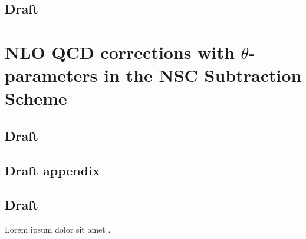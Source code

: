 \documentclass[a4paper, 12pt]{book}
\begin{document}
\section{Draft}

\clearpage

\chapter{NLO QCD corrections with $\theta$-parameters in the NSC Subtraction Scheme}

\section{Draft}

\clearpage

\begin{appendices}
\pagestyle{append}

\chapter{Draft appendix}

\section{Draft}

Lorem ipsum dolor sit amet \cite{pauli}.

\clearpage
\end{appendices}

\pagestyle{biblio}
\printbibliography[heading = bibintoc, title = {Bibliography}]
\end{document}
